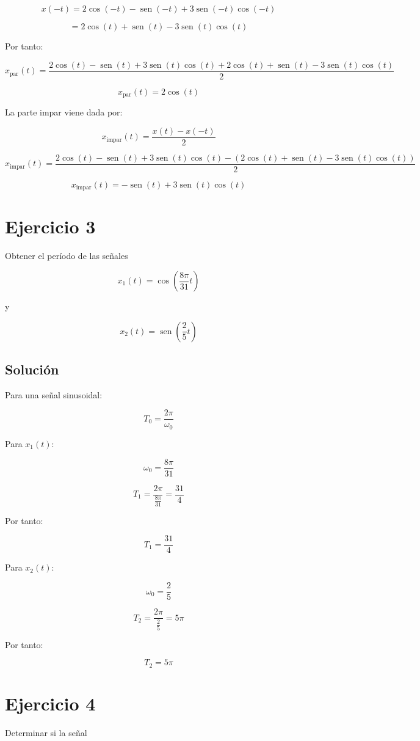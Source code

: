 \documentclass[fleqn]{article}
\DeclareMathOperator{\sen}{sen}
\begin{document}
	\[
	x(-t)
	=
	2\cos(-t)-\sen(-t)+3\sen(-t)\cos(-t)
	\]

	\[
	=
	2\cos(t)+\sen(t)-3\sen(t)\cos(t)
	\]

	Por tanto:

	\[
	x_{\text{par}}(t)
	=
	\frac{
	2\cos(t)-\sen(t)+3\sen(t)\cos(t)
	+
	2\cos(t)+\sen(t)-3\sen(t)\cos(t)
	}{2}
	\]

	\[
	\boxed{
	x_{\text{par}}(t)=2\cos(t)
	}
	\]

	La parte impar viene dada por:

	\[
	x_{\text{impar}}(t)
	=
	\frac{x(t)-x(-t)}{2}
	\]

	\[
	x_{\text{impar}}(t)
	=
	\frac{
	2\cos(t)-\sen(t)+3\sen(t)\cos(t)
	-
	\left(
	2\cos(t)+\sen(t)-3\sen(t)\cos(t)
	\right)
	}{2}
	\]

	\[
	\boxed{
	x_{\text{impar}}(t)
	=
	-\sen(t)+3\sen(t)\cos(t)
	}
	\]

\section{Ejercicio 3}
	Obtener el período de las señales

	\[
	x_1(t)=\cos\left(\frac{8\pi}{31}t\right)
	\]

	y

	\[
	x_2(t)=\sen\left(\frac{2}{5}t\right)
	\]

	\subsection{Solución}

	Para una señal sinusoidal:

	\[
	T_0=\frac{2\pi}{\omega_0}
	\]

	Para $x_1(t)$:

	\[
	\omega_0=\frac{8\pi}{31}
	\]

	\[
	T_1
	=
	\frac{2\pi}{\frac{8\pi}{31}}
	=
	\frac{31}{4}
	\]

	Por tanto:

	\[
	\boxed{
	T_1=\frac{31}{4}
	}
	\]

	Para $x_2(t)$:

	\[
	\omega_0=\frac{2}{5}
	\]

	\[
	T_2
	=
	\frac{2\pi}{\frac{2}{5}}
	=
	5\pi
	\]

	Por tanto:

	\[
	\boxed{
	T_2=5\pi
	}
	\]

\section{Ejercicio 4}
	Determinar si la señal
\end{document}
